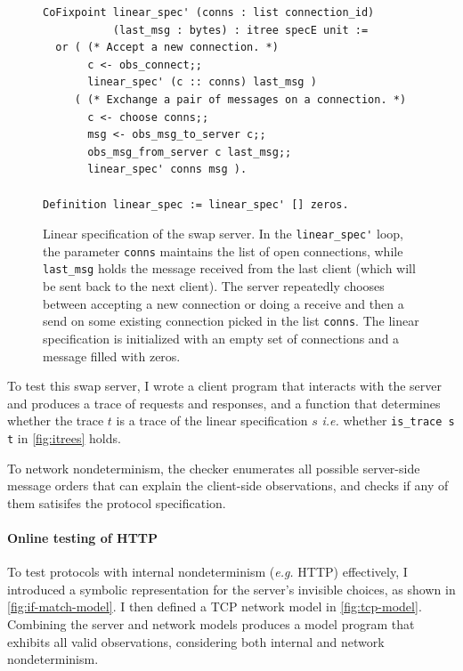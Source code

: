 \documentclass{article}
\newcommand{\ilc}[1]{\lstinline[style=customcoq]{#1}}
\theoremstyle{definition}
\begin{document}
\begin{figure}
\begin{lstlisting}[style=customcoq]
CoFixpoint linear_spec' (conns : list connection_id)
           (last_msg : bytes) : itree specE unit :=
  or ( (* Accept a new connection. *)
       c <- obs_connect;;
       linear_spec' (c :: conns) last_msg )
     ( (* Exchange a pair of messages on a connection. *)
       c <- choose conns;;
       msg <- obs_msg_to_server c;;
       obs_msg_from_server c last_msg;;
       linear_spec' conns msg ).

Definition linear_spec := linear_spec' [] zeros.
\end{lstlisting}
\caption{Linear specification of the swap server.  In the \ilc{linear_spec'}
  loop, the parameter \ilc{conns} maintains the list of open connections, while
  \ilc{last_msg} holds the message received from the last client (which will be
  sent back to the next client).  The server repeatedly chooses between
  accepting a new connection or doing a receive and then a send on some existing
  connection picked in the list \ilc{conns}.  The linear specification is
  initialized with an empty set of connections and a message filled with zeros.}
\label{fig:linear-spec}
\end{figure}

To test this swap server, I wrote a client program that interacts with the
server and produces a trace of requests and responses, and a function that
determines whether the trace $t$ is a trace of the linear specification $s$ {\it
  i.e.} whether \ilc{is_trace s t} in \autoref{fig:itrees} holds.

To network nondeterminism, the checker enumerates all possible server-side
message orders that can explain the client-side observations, and checks if any
of them satisifes the protocol specification.

\paragraph{Online testing of HTTP}
To test protocols with internal nondeterminism ({\it e.g.} HTTP) effectively, I
introduced a symbolic representation for the server's invisible choices, as
shown in \autoref{fig:if-match-model}.  I then defined a TCP network model in
\autoref{fig:tcp-model}.  Combining the server and network models produces a
model program that exhibits all valid observations, considering both internal
and network nondeterminism.
\end{document}
